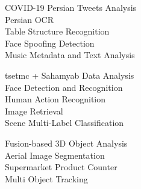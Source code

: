\documentclass[9pt]{developercv} %
\begin{document}
\begin{minipage}[t]{0.3\textwidth}
	\vspace{-\baselineskip} %
	
	
	COVID-19 Persian Tweets Analysis
	\\Persian OCR
	\\Table Structure Recognition
	\\Face Spoofing Detection
	\\Music Metadata and Text Analysis
	
\end{minipage}
\begin{minipage}[t]{0.3\textwidth}
	\vspace{-\baselineskip} %
	
	
	tsetmc + Sahamyab Data Analysis
	\\Face Detection and Recognition
	\\Human Action Recognition
	\\Image Retrieval
	\\Scene Multi-Label Classification
	
\end{minipage}
\begin{minipage}[t]{0.3\textwidth}
	\vspace{-\baselineskip} %
	
	
	Fusion-based 3D Object Analysis
	\\Aerial Image Segmentation
	\\Supermarket Product Counter
	\\Multi Object Tracking
	
\end{minipage}	





\end{document}
